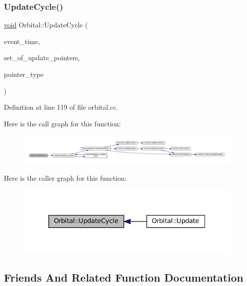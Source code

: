 \subsubsection{\texorpdfstring{Update\+Cycle()}{UpdateCycle()}}
{\footnotesize\ttfamily \mbox{\hyperlink{glad_8h_a950fc91edb4504f62f1c577bf4727c29}{void}} Orbital\+::\+Update\+Cycle (\begin{DoxyParamCaption}\item[{std\+::chrono\+::time\+\_\+point$<$ \mbox{\hyperlink{universe_8h_a0ef8d951d1ca5ab3cfaf7ab4c7a6fd80}{Clock}} $>$}]{event\+\_\+time,  }\item[{std\+::vector$<$ \mbox{\hyperlink{class_cognitive_network}{Cognitive\+Network}} $\ast$$>$}]{set\+\_\+of\+\_\+update\+\_\+pointers,  }\item[{unsigned int}]{pointer\+\_\+type }\end{DoxyParamCaption})}



Definition at line 119 of file orbital.\+cc.

Here is the call graph for this function\+:\nopagebreak
\begin{figure}[H]
\begin{center}
\leavevmode
\includegraphics[width=350pt]{class_orbital_afbf72ba4e260627422c9f53dea793923_cgraph}
\end{center}
\end{figure}
Here is the caller graph for this function\+:\nopagebreak
\begin{figure}[H]
\begin{center}
\leavevmode
\includegraphics[width=325pt]{class_orbital_afbf72ba4e260627422c9f53dea793923_icgraph}
\end{center}
\end{figure}


\subsection{Friends And Related Function Documentation}
\mbox{\label{class_orbital_aa410d74ba34b18a9f6bdf24323c4ee5b}} 
